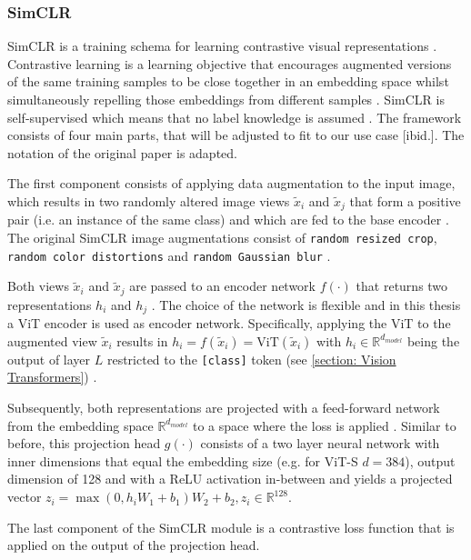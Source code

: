 \subsubsection{SimCLR}
\label{section: SimCLR}
SimCLR is a training schema for learning contrastive visual representations \citep{Chen2020}.
Contrastive learning is a learning objective that encourages augmented versions of the same training samples to be close together in an embedding space whilst simultaneously repelling those embeddings from different samples \citep{Jaiswal2020}.
SimCLR is self-supervised which means that no label knowledge is assumed \citep{Chen2020}.
The framework consists of four main parts, that will be adjusted to fit to our use case [ibid.].
The notation of the original paper is adapted.
\par
The first component consists of applying data augmentation to the input image, which results in two randomly altered image views $\tilde{x}_i$ and $\tilde{x}_j$ that form a positive pair (i.e. an instance of the same class) and which are fed to the base encoder \citep{Chen2020}.
The original SimCLR image augmentations consist of \texttt{random resized crop}, \texttt{random color distortions} and \texttt{random Gaussian blur} \citep{Chen2020}.
\par
Both views $\tilde{x}_i$ and $\tilde{x}_j$ are passed to an encoder network $f(\cdot)$ that returns two representations $h_i$ and $h_j$ \citep{Chen2020}.
The choice of the network is flexible and in this thesis a ViT encoder is used as encoder network.
Specifically, applying the ViT to the augmented view $\tilde{x}_i$ results in $h_i = f(\tilde{x}_i) = \text{ViT}(\tilde{x}_i)$ with $h_i \in \mathbb{R}^{d_{model}}$ being the output of layer $L$ restricted to the \texttt{[class]} token (see \ref{section: Vision Transformers}) \citep{Chen2020}.
\par
Subsequently, both representations are projected with a feed-forward network from the embedding space $\mathbb{R}^{d_{model}}$ to a space where the loss is applied \citep{Chen2020}.
Similar to before, this projection head $g(\cdot)$ consists of a two layer neural network with inner dimensions that equal the embedding size (e.g. for ViT-S $d=384$), output dimension of 128 and with a ReLU activation in-between \citep{Chen2020} and yields a projected vector $z_i = \max(0, h_iW_1 + b_1)W_2+b_2, z_i \in \mathbb{R}^{128}$.
\par 
The last component of the SimCLR module is a contrastive loss function that is applied on the output of the projection head.
